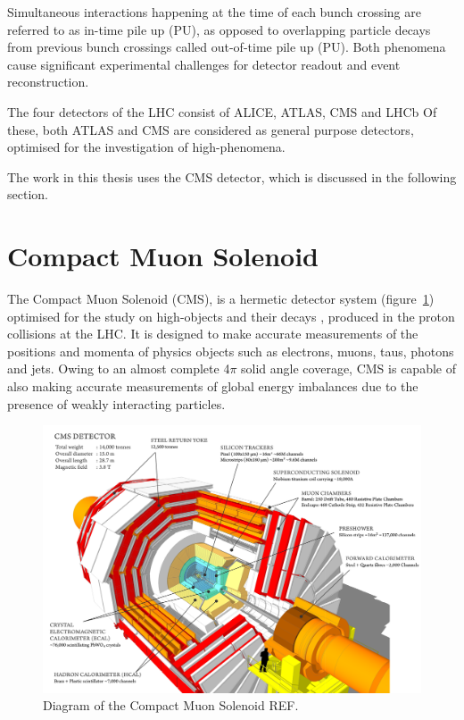 Simultaneous interactions happening at the time
of each bunch crossing are referred to as in-time pile up (PU), as opposed to 
overlapping particle decays from previous bunch crossings called out-of-time 
pile up (PU). Both phenomena cause significant 
experimental challenges for detector readout and event reconstruction.

The four detectors of the LHC consist of ALICE, ATLAS, CMS and LHCb Of these,
both ATLAS and CMS 
are considered as general purpose detectors, optimised for the investigation of
high-\Pt phenomena.

The work in this thesis uses the CMS detector, which is discussed in 
the following section.


\section{Compact Muon Solenoid}  %
\label{sec:detector_overview}

The Compact Muon Solenoid (CMS), is a
hermetic detector system (figure~\ref{fig:cms_diagram})
optimised for the study on high-\Pt objects and their decays \cite{CMSexperiment},
produced in the 
proton collisions at the LHC. It is designed to make accurate measurements of 
the positions and momenta of physics objects such as electrons, muons, taus, 
photons and jets. Owing to an almost complete 4$\pi$ solid angle coverage, CMS is 
capable of also making accurate measurements of global energy imbalances due to 
the presence of weakly interacting particles.

\begin{figure}[hb!]
  \centering
  \includegraphics[width=\textwidth]{Figs/machine/cms_120918_02.png}
  \caption{Diagram of the Compact Muon Solenoid REF.}
  \label{fig:cms_diagram}
\end{figure}

